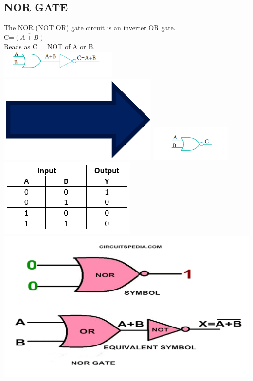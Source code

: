 \documentclass{article}
\begin{document}
\subsection{NOR GATE}
The NOR (NOT OR) gate circuit is an inverter OR gate.\\
C=$\overline{(A+B)}$\\
Reads as C = NOT of A or B.\\
\includegraphics[width=0.3\linewidth]{Picture 5.png}\includegraphics[width=0.1\linewidth]{Picture 5.1.png}  \includegraphics[width=0.3\linewidth]{Picture 5.2.png}\\
\includegraphics[width=0.3\linewidth]{Unknown-4.png}
\newpage
\includegraphics[width=1.0\linewidth]{Picture 6}\\
\newpage
\end{document}
